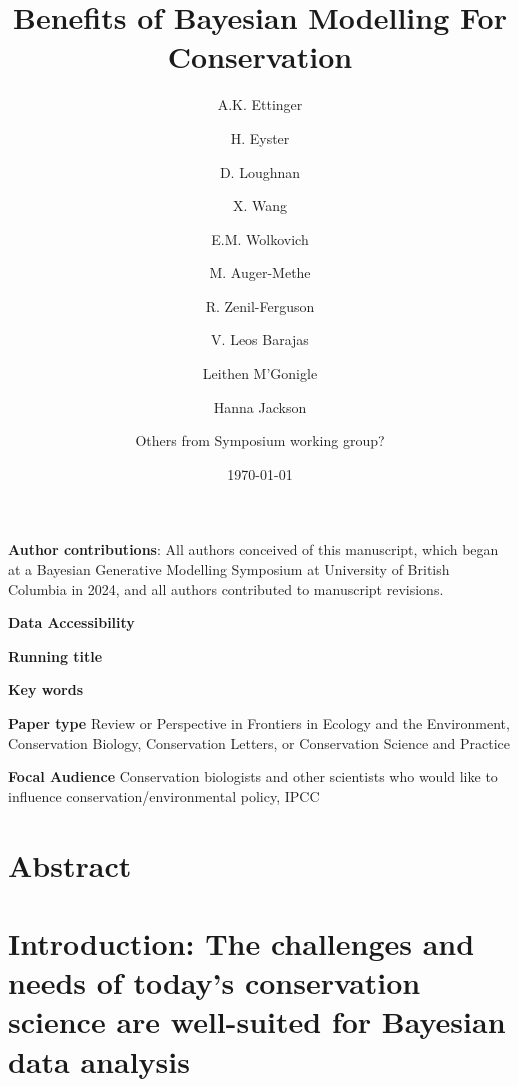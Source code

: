 \documentclass{article}
\begin{document}



\title{Benefits of Bayesian Modelling For Conservation} 
\author[1,a]{A.K. Ettinger}
\author[2]{H. Eyster}
\author[3]{D. Loughnan}
\author[3]{X. Wang}
\author[3]{E.M. Wolkovich}
\author[3]{M. Auger-Methe}
\author[4]{R. Zenil-Ferguson}
\author[5]{V. Leos Barajas}
\author[6]{Leithen M'Gonigle}
\author[6]{Hanna Jackson}
\author[7]{Others from Symposium working group?}





\date{\today}
\maketitle 
\textbf{Author contributions}: All authors conceived of this manuscript, which began at a Bayesian Generative Modelling Symposium at University of British Columbia in 2024, and all authors contributed to manuscript revisions.

\textbf{Data Accessibility} 

\textbf{Running title} 

\textbf{Key words} 


\textbf{Paper type} Review or Perspective in Frontiers in Ecology and the Environment, Conservation Biology, Conservation Letters, or Conservation Science and Practice

\textbf{Focal Audience} Conservation biologists and other scientists who would like to influence conservation/environmental policy, IPCC 






\section*{Abstract} 


\newpage
\section* {Introduction: The challenges and needs of today's conservation science are well-suited for Bayesian data analysis}
\end{document}
